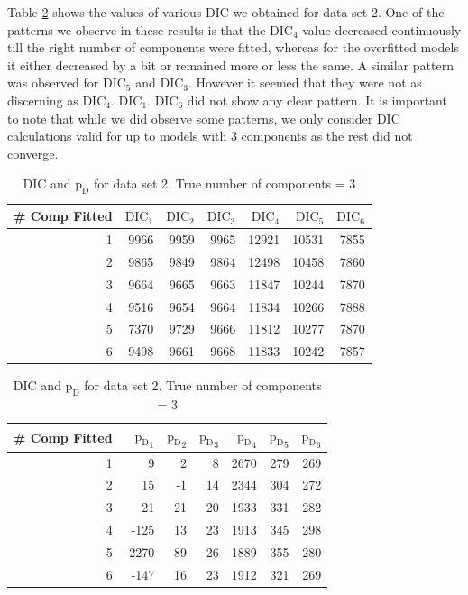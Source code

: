 Table \ref{table : ds_3wellsep_dic} shows the values of various DIC we obtained for data set 2. One of the patterns we observe in these results is that the $\text{DIC}_4$ value decreased continuously till the right number of components were fitted, whereas for the overfitted models it either decreased by a bit or remained more or less the same. A similar pattern was observed for $\text{DIC}_5$ and $\text{DIC}_3$. However it seemed that they were not as discerning as $\text{DIC}_4$. $\text{DIC}_1$. $\text{DIC}_6$ did not show any clear pattern. It is important to note that while we did observe some patterns, we only consider DIC calculations valid for up to models with 3 components as the rest did not converge.\\

\begin{table}[!htb]
\centering
\captionsetup{justification=centering}
\caption{DIC and $\text{p}_\text{D}$ for data set 2. True number of components = 3}
\label{table : ds_3wellsep_dic} 
\begin{tabular}{@{}rrrrrrr@{}}
\toprule
\# Comp Fitted & $\text{DIC}_1$ & $\text{DIC}_2$  & $\text{DIC}_3$  & $\text{DIC}_4$  & $\text{DIC}_5$  & $\text{DIC}_6$  \\ \midrule
1 & 9966 & 9959 & 9965 & 12921 & 10531 & 7855 \\
2 & 9865 & 9849 & 9864 & 12498 & 10458 & 7860 \\
3 & 9664 & 9665 & 9663 & 11847 & 10244 & 7870 \\
4 & 9516 & 9654 & 9664 & 11834 & 10266 & 7888 \\
5 & 7370 & 9729 & 9666 & 11812 & 10277 & 7870 \\
6 & 9498 & 9661 & 9668 & 11833 & 10242 & 7857 \\ \bottomrule
\end{tabular}

\begin{tabular}{@{}rrrrrrr@{}}
\toprule
\# Comp Fitted & ${\text{p}_\text{D}}_1$ & ${\text{p}_\text{D}}_2$ & ${\text{p}_\text{D}}_3$ & ${\text{p}_\text{D}}_4$ & ${\text{p}_\text{D}}_5$ & ${\text{p}_\text{D}}_6$ \\ \midrule
1 & 9 & 2 & 8 & 2670 & 279 & 269 \\
2 & 15 & -1 & 14 & 2344 & 304 & 272 \\
3 & 21 & 21 & 20 & 1933 & 331 & 282 \\
4 & -125 & 13 & 23 & 1913 & 345 & 298 \\
5 & -2270 & 89 & 26 & 1889 & 355 & 280 \\
6 & -147 & 16 & 23 & 1912 & 321 & 269 \\ \bottomrule
\end{tabular}
\end{table}

